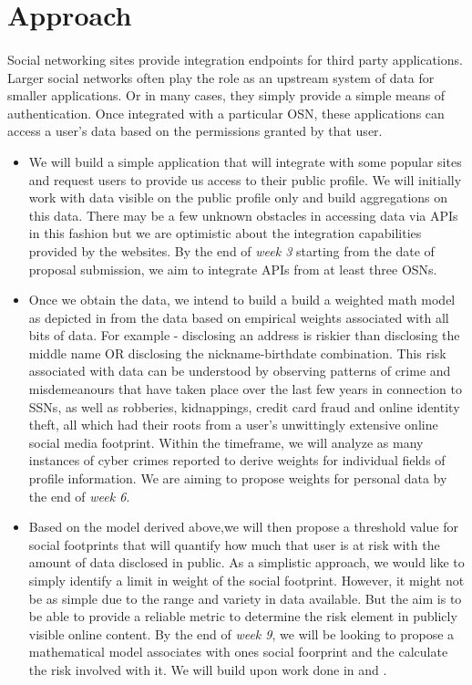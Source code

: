 \documentclass[11pt]{article}
\begin{document}
\section{Approach}
\paragraph{}
Social networking sites provide integration endpoints for third party applications. Larger social networks often play the role as an upstream system of data for smaller applications. Or in many cases, they simply provide a simple means of authentication. Once integrated with a particular OSN, these applications can access a user’s data based on the permissions granted by that user.
  \begin{itemize}
   \item We will build a simple application that will integrate with some popular sites and request users to provide us access to their public profile. We will initially work with data visible on the public profile only and build aggregations on this data. There may be a few unknown obstacles in accessing data via APIs in this fashion but we are optimistic about the integration capabilities provided by the websites. By the end of {\sl week 3} starting from the date of proposal submission, we aim to integrate APIs from at least three OSNs.
   \item Once we obtain the data, we intend to build a build a weighted math model as depicted in \cite{leakage} from the data based on empirical weights associated with all bits of data. For example - disclosing an address is riskier than disclosing the middle name OR disclosing the nickname-birthdate combination. This risk associated with data can be understood by observing patterns of crime and misdemeanours that have taken place over the last few years in connection to SSNs, as well as robberies, kidnappings, credit card fraud and online identity theft, all which had their roots from a user's unwittingly extensive online social media footprint. Within the timeframe, we will analyze as many instances of cyber crimes reported to derive weights for individual fields of profile information. We are aiming to propose weights for personal data by the end of {\sl week 6}.
   \item Based on the model derived above,we will then propose a threshold value for social footprints that will quantify how much that user is at risk with the amount of data disclosed in public. As a simplistic approach, we would like to simply identify a limit in weight of the social footprint. However, it might not be as simple due to the range and variety in data available. But the aim is to be able to provide a reliable metric to determine the risk element in publicly visible online content. By the end of {\sl week 9}, we will be looking to propose a mathematical model associates with ones social foorprint and the calculate the risk involved with it. We will build upon work done in \cite{pidx} and \cite{leakage}.

\end{itemize}
\end{document}
